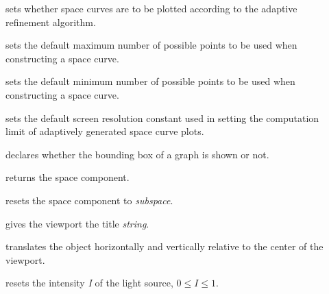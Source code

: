 \begin{description}
%
\item[]
sets whether space curves are to be plotted
according to the adaptive
refinement algorithm.

%
\item[]
 sets the default maximum number of possible
points to be used when constructing a \threedim{} space curve.

%
\item[]
sets the default minimum number of possible
points to be used when constructing a \threedim{} space curve.

%
\item[]
sets the default screen resolution constant
used in setting the computation limit of adaptively
generated \threedim{} space curve plots.

%
\item[]
declares whether the bounding
box of a graph is shown or not.
%
\item[]
returns the space component.
%
\item[]
resets the space component
to {\it subspace}.

%
\item[]
gives the viewport the
title {\it string}.

%
\item[]
translates
the object horizontally and vertically relative to the center of the viewport.

%
\item[]
resets the intensity {\it I} of the light source,
$0 \le I \le 1.$


\end{description}
